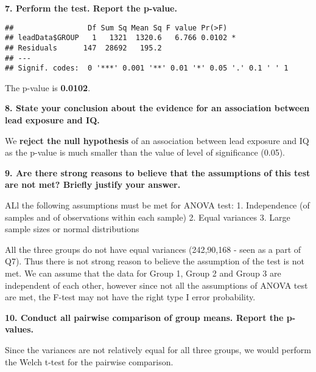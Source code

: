 \documentclass[
]{article}
\newenvironment{Shaded}{\begin{snugshade}}{\end{snugshade}}
\newcommand{\DataTypeTok}[1]{\textcolor[rgb]{0.13,0.29,0.53}{#1}}
\newcommand{\KeywordTok}[1]{\textcolor[rgb]{0.13,0.29,0.53}{\textbf{#1}}}
\newcommand{\NormalTok}[1]{#1}
\newcommand{\OperatorTok}[1]{\textcolor[rgb]{0.81,0.36,0.00}{\textbf{#1}}}
\newcommand{\StringTok}[1]{\textcolor[rgb]{0.31,0.60,0.02}{#1}}
\begin{document}
\textbf{7. Perform the test. Report the p-value.}

\begin{Shaded}
\end{Shaded}

\begin{verbatim}
##                 Df Sum Sq Mean Sq F value Pr(>F)  
## leadData$GROUP   1   1321  1320.6   6.766 0.0102 *
## Residuals      147  28692   195.2                 
## ---
## Signif. codes:  0 '***' 0.001 '**' 0.01 '*' 0.05 '.' 0.1 ' ' 1
\end{verbatim}

The p-value is \textbf{0.0102}.

\textbf{8. State your conclusion about the evidence for an association
between lead exposure and IQ.}

We \textbf{reject the null hypothesis} of an association between lead
exposure and IQ as the p-value is much smaller than the value of level
of significance (0.05).

\textbf{9. Are there strong reasons to believe that the assumptions of
this test are not met? Briefly justify your answer.}

ALl the following assumptions must be met for ANOVA test: 1.
Independence (of samples and of observations within each sample) 2.
Equal variances 3. Large sample sizes or normal distributions

All the three groups do not have equal variances (242,90,168 - seen as a
part of Q7). Thus there is not strong reason to believe the assumption
of the test is not met. We can assume that the data for Group 1, Group 2
and Group 3 are independent of each other, however since not all the
assumptions of ANOVA test are met, the F-test may not have the right
type I error probability.

\textbf{10. Conduct all pairwise comparison of group means. Report the
p-values.}

Since the variances are not relatively equal for all three groups, we
would perform the Welch t-test for the pairwise comparison.

\begin{Shaded}
\end{Shaded}
\end{document}
